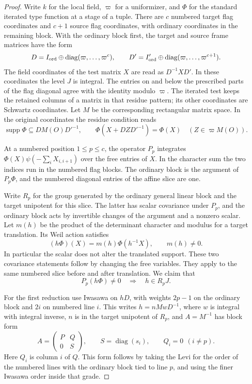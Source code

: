 \begin{proof}
Write \(k\) for the local field, \(\varpi\) for a uniformizer,
and \(\Phi\) for the standard iterated type function at a stage
of a tuple. There are \(c\) numbered target flag coordinates
and \(c+1\) source flag coordinates, with ordinary coordinates
in the remaining block. With the ordinary block first, the target and source frame
matrices have the form
\[
 D=I_{\rm ord}\oplus\operatorname{diag}(\varpi,\ldots,\varpi^c),
 \qquad D'=I_{\rm ord}'\oplus
             \operatorname{diag}(\varpi,\ldots,\varpi^{c+1}).
\] The field coordinates of
the test matrix \(X\) are read as \(D^{-1}XD'\). In these
coordinates the level \(J\) is integral. The entries on
and below the prescribed parts of the flag diagonal agree
with the identity modulo \(\varpi\). The iterated test keeps
the retained columns of a matrix in that residue pattern;
its other coordinates are Schwartz coordinates. Let \(M\) be the corresponding rectangular matrix space. In the
original coordinates the residue condition reads
\[
 \operatorname{supp}\Phi\subseteq D M(O)D'^{-1},\qquad
 \Phi(X+DZD'^{-1})=\Phi(X)\quad(Z\in\varpi M(O)).
\]

At a numbered position \(1\le p\le c\), the operator \(P_p\)
integrates \(\Phi(X)\psi(-\sum_i X_{i,i+1})\) over the free
entries of \(X\). In the character sum the two indices run
in the numbered flag blocks. The ordinary block is the
argument of \(P_p\Phi\), and the numbered diagonal entries
of the affine slice are one.

Write \(R_p\) for the group
generated by the ordinary general linear block and the
target unipotent for this slice. The latter has scalar
covariance under \(P_p\), and the ordinary block acts by
invertible changes of the argument and a nonzero scalar.
Let \(m(h)\) be the product of the determinant character
and modulus for a target translation. Its Weil action satisfies
\[
 (h\Phi)(X)=m(h)\Phi(h^{-1}X),\qquad m(h)\ne0.
\]
In particular the scalar does not alter the translated support. These two covariance
statements follow by changing the free variables. They
apply to the same numbered slice before and after translation.
We claim that
\begin{equation}\label{eq:position-level-support}
                   P_p(h\Phi)\ne0\quad\Longrightarrow\quad h\in R_pJ .
\end{equation}

For the first reduction use Iwasawa on \(hD\), with weights
\(2p-1\) on the ordinary block and \(2i\) on numbered
line \(i\). This writes \(h=n M w D^{-1}\), where \(w\) is
integral with integral inverse, \(n\) is in the target
unipotent of \(R_p\), and \(A=M^{-1}\) has block form
\[
          A=\begin{pmatrix}P&Q\\0&S\end{pmatrix},
       \qquad S=\operatorname{diag}(s_i),\qquad Q_i=0\ \ (i\ne p).
\]
Here \(Q_i\) is column \(i\) of \(Q\). This form follows by
taking the Levi for the order of the numbered lines with
the ordinary block tied to line \(p\), and using the finer
Iwasawa order inside that grade.


\end{proof}
